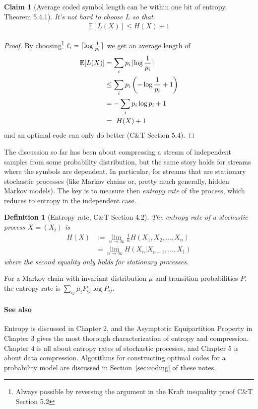 \documentclass{article}
\newtheorem{claim}{Claim}
\newtheorem{mydef}{Definition}
\DeclarePairedDelimiter{\ceil}{\lceil}{\rceil}
\newcommand{\E}{\mathbb{E}}
\begin{document}
    \begin{claim}[Average coded symbol length can be within one bit of entropy, Theorem 5.4.1]
        It's not hard to choose $L$ so that
        \begin{align}
            \E[L(X)] \leq H(X) + 1
        \end{align}
    \end{claim}
    \begin{proof}
        By choosing\footnote{Always possible by reversing the argument in the
            Kraft inequality proof C\&T Section 5.2}
        $\ell_i = \ceil{\log \frac{1}{p_i}}$ we get an average length of
        \begin{align}
            \E[L(X)] &= \sum_i p_i \ceil{\log \frac{1}{p_i}}\\
            &\leq \sum_i p_i \left( - \log \frac{1}{p_i} + 1 \right)\\
            &= - \sum_i p_i \log p_i + 1 \\
            &= \ H(X)+1
        \end{align}
        and an optimal code can only do better (C\&T Section 5.4).
    \end{proof}

    The discussion so far has been about compressing a stream of independent
    samples from some probability distribution, but the same story holds for
    streams where the symbols are dependent. In particular, for streams that
    are stationary stochastic processes (like Markov chains or, pretty much
    generally, hidden Markov models). The key is to measure then \emph{entropy
    rate} of the process, which reduces to entropy in the independent case.

    \begin{mydef}[Entropy rate, C\&T Section 4.2]
        The \emph{entropy rate} of a stochastic process $X=(X_i)$ is
        \begin{align}
            H(X) &:= \lim_{n \to \infty} \frac{1}{n} H(X_1, X_2, \ldots, X_n)\\
            &= \lim_{n \to \infty} H(X_n | X_{n-1}, \ldots, X_1)
        \end{align}
        where the second equality only holds for stationary processes.
    \end{mydef}

    For a Markov chain with invariant distribution $\mu$ and transition
    probabilities $P$, the entropy rate is $\sum_{ij} \mu_i P_{ij} \log
    P_{ij}$.

    \paragraph{See also} Entropy is discussed in Chapter 2, and the
    Asymptotic Equipartition Property in Chapter 3 gives the most thorough
    characterization of entropy and compression. Chapter 4 is all about entropy
    rates of stochastic processes, and Chapter 5 is about data compression.
    Algorithms for constructing optimal codes for a probability model are
    discussed in Section~\ref{sec:coding} of these notes.
\end{document}
